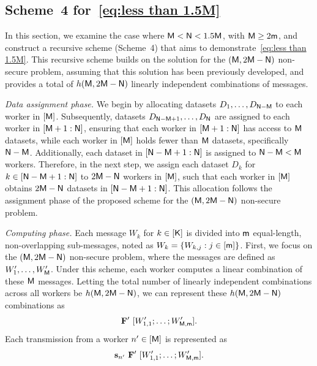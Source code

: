\documentclass[conference,letterpaper]{IEEEtran}
\begin{document}
\subsection{\texorpdfstring{Scheme~4 for~\eqref{eq:less than 1.5M}}{Scheme 4 for Eq. (Z)}}
\label{sub:less than 1.5M}
In this section, we examine the case where ${\sf M} < {\sf N} < 1.5 {\sf M}$, with ${\sf M} \geq 2{\sf m}$, and construct a recursive scheme (Scheme~4) that aims to demonstrate~\eqref{eq:less than 1.5M}. This recursive scheme builds on the solution for the $({\sf M}, 2{\sf M}-{\sf N})$ non-secure problem, assuming that this solution has been previously developed, and provides a total of $h({\sf M}, 2{\sf M}-{\sf N})$ linearly independent combinations of messages.

{\it Data assignment phase.} We begin by allocating datasets $D_{1}, \ldots, D_{{\sf N}-{\sf M}}$ to each worker in $[{\sf M}]$. Subsequently, datasets $D_{{\sf N}-{\sf M}+1}, \ldots, D_{{\sf N}}$ are assigned to each worker in $[{\sf M}+1:{\sf N}]$, ensuring that each worker in $[{\sf M}+1:{\sf N}]$ has access to ${\sf M}$ datasets, while each worker in $[{\sf M}]$ holds fewer than ${\sf M}$ datasets, specifically ${\sf N} - {\sf M}$. Additionally, each dataset in $[{\sf N}-{\sf M}+1 : {\sf N}]$ is assigned to ${\sf N} - {\sf M} < {\sf M}$ workers. Therefore, in the next step, we assign each dataset $D_k$ for $k \in [{\sf N} - {\sf M} + 1 : {\sf N}]$ to $2{\sf M} - {\sf N}$ workers in $[{\sf M}]$, such that each worker in $[{\sf M}]$ obtains $2{\sf M} - {\sf N}$ datasets in $[{\sf N} - {\sf M} + 1 : {\sf N}]$. This allocation follows the assignment phase of the proposed scheme for the $({\sf M}, 2{\sf M}-{\sf N})$ non-secure problem.

{\it Computing phase.} Each message $W_k$ for $k \in [{\sf K}]$ is divided into ${\sf m}$ equal-length, non-overlapping sub-messages, noted as $W_k = \{W_{k,j} : j \in [{\sf m}]\}$. First, we focus on the $({\sf M}, 2{\sf M}-{\sf N})$ non-secure problem, where the messages are defined as $W^{\prime}_1, \ldots, W^{\prime}_{{\sf M}}$. Under this scheme, each worker computes a linear combination of these ${\sf M}$ messages. Letting the total number of linearly independent combinations across all workers be $h({\sf M}, 2{\sf M}-{\sf N})$, we can represent these $h({\sf M}, 2{\sf M}-{\sf N})$ combinations as  
\begin{align}
{\bf F}' \  [W^{\prime}_{1,1}; \ldots; W^{\prime}_{{\sf M},{\sf m}}].\label{eq:F_1}
\end{align}
Each transmission from a worker $n^{\prime} \in \left[ {\sf M} \right]$ is represented as
$$
{\bf s}_{n^{\prime}} \ {\bf F}'  \  [W^{\prime}_{1,1}; \ldots; W^{\prime}_{{\sf M},{\sf m}}].
$$
\end{document}
